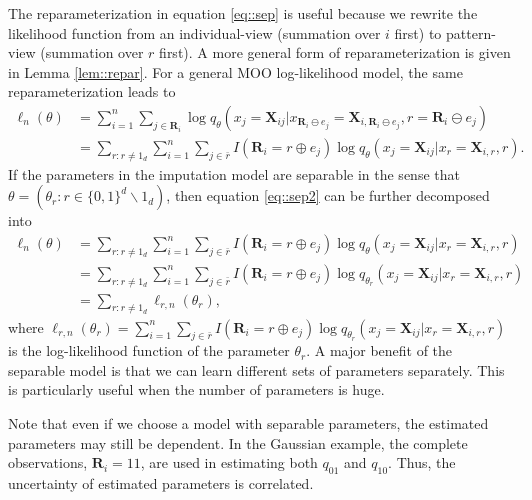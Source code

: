 \documentclass[aos, preprint]{imsart}
\theoremstyle{plain}
\theoremstyle{definition}
\newcommand{\bX}{\mathbf{X}}
\newcommand{\bR}{\mathbf{R}}
\begin{document}
\begin{appendix}
The reparameterization in equation \eqref{eq::sep}
is useful because we rewrite the likelihood function from an individual-view (summation over $i$ first) to pattern-view (summation over $r$ first).
A more general form of reparameterization is given in Lemma \ref{lem::repar}.
For a general MOO log-likelihood model, the same reparameterization leads to
\begin{equation}
\begin{aligned}
\ell_n(\theta) & = \sum_{i=1}^n\sum_{j \in \bR_i} \log q_\theta(x_j = \bX_{ij}|x_{\bR_i\ominus e_j} = \bX_{i, \bR_i\ominus e_j}, r = \bR_i\ominus e_j)\\
& = \sum_{r:r\neq 1_d} \sum_{i=1}^n   \sum_{j \in \bar r} I(\bR_i = r\oplus e_j)\log q_\theta(x_j = \bX_{ij}|x_{r} = \bX_{i,r}, r) .
\end{aligned}
\label{eq::sep2}
\end{equation}
If the parameters in the imputation model are separable  in the sense that $\theta = (\theta_r: r \in \{0,1\}^d\backslash 1_d)$, then 
equation \eqref{eq::sep2} can be further decomposed into 
\begin{equation}
\begin{aligned}
\ell_n(\theta)
& = \sum_{r:r\neq 1_d} \sum_{i=1}^n   \sum_{j \in \bar r} I(\bR_i = r\oplus e_j)\log q_\theta(x_j = \bX_{ij}|x_{r} = \bX_{i,r}, r) \\
& = \sum_{r:r\neq 1_d} \sum_{i=1}^n   \sum_{j \in \bar r} I(\bR_i = r\oplus e_j)\log q_{\theta_r}(x_j = \bX_{ij}|x_{r} = \bX_{i,r}, r)\\
& = \sum_{r:r\neq 1_d} \ell_{r, n}(\theta_r),
\end{aligned}
\label{eq::sep3}
\end{equation}
where $\ell_{r, n}(\theta_r) = \sum_{i=1}^n   \sum_{j \in \bar r} I(\bR_i = r\oplus e_j)\log q_{\theta_r}(x_j = \bX_{ij}|x_{r} = \bX_{i,r}, r)$
is the log-likelihood function of the parameter $\theta_r$.
A major benefit of the separable model is that we can learn different sets of 
parameters separately. This is particularly useful when the number of parameters is huge. 



Note that even if we choose a model with separable parameters,
the estimated parameters may still be dependent. 
In the Gaussian example, the complete observations, $\bR_i = 11$,
are used in estimating both $q_{01}$ and $q_{10}$. 
Thus, the uncertainty of estimated parameters is correlated. 




\end{appendix}
\end{document}
